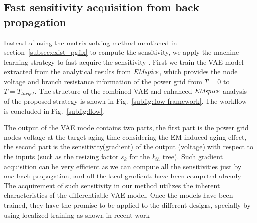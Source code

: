 

\subsection{Fast sensitivity acquisition from back propagation}
\label{sec:new_VAEframework}
Instead of using the matrix solving method mentioned in section~\ref{subsec:exist_pgfix} to compute the sensitivity, we apply the machine learning strategy to fast acquire the sensitivity . First we train the VAE model extracted from the analytical results from $\it{EMspice}$, which provides the node voltage and branch resistance information of the power grid from $T = 0$ to $T = T_{target}$. 
The structure of the combined VAE and enhanced $\it{EMspice}$ analysis of the proposed strategy is shown in Fig.~\ref{subfig:flow-framework}. The workflow is concluded in Fig.~\ref{subfig:flow}. 

The output of the VAE mode contains two parts, the first part is the power grid nodes voltage at the target aging time considering the EM-induced aging effect, the second part is the sensitivity(gradient) of the output (voltage) with respect to the inputs (such as the resizing factor $s_{k}$ for the $k_{th}$ tree).  Such gradient acquisition can be very efficient as we can compute all the sensitivities just by one back propagation, and all the local gradients have been computed already. The acquirement of such sensitivity in our method utilizes the inherent characteristics of the differentiable VAE model. Once the models have been trained, they have the promise to be applied to the different designs, specially by using localized training as shown in recent work~\cite{WenPan:SemiTherm'2020}. 



